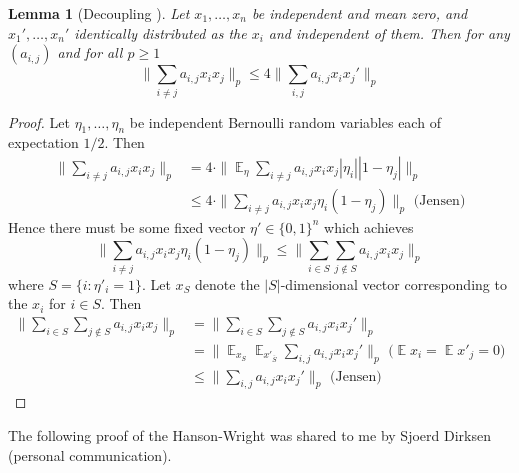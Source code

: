 \documentclass[12pt]{article}
\DeclareMathOperator*{\E}{\mathbb{E}}
\newtheorem{lemma}{Lemma}
\newcommand{\EquationName}[1]{\label{eq:#1}}
\newcommand{\LemmaName}[1]{\label{lem:#1}}
\begin{document}
\begin{lemma}[Decoupling {\cite{PenaG99}}]\LemmaName{decoupling}
Let $x_1,\ldots,x_n$ be independent and mean zero, and $x_1',\ldots,x_n'$ identically distributed as the $x_i$ and independent of them. Then for any $(a_{i,j})$ and for all $p\ge 1$
$$
\|\sum_{i\neq j} a_{i,j} x_i x_j\|_p \le 4 \|\sum_{i,j} a_{i ,j} x_i x_j'\|_p
$$
\end{lemma}
\begin{proof}
Let $\eta_1,\ldots,\eta_n$ be independent Bernoulli random variables each of expectation $1/2$. Then
\begin{align}
\nonumber \|\sum_{i\neq j} a_{i,j} x_i x_j\|_p &= 4\cdot \|\E_\eta \sum_{i\neq j} a_{i,j} x_i x_j |\eta_i| |1-\eta_j|\|_p\\
{}&\le 4\cdot \|\sum_{i\neq j} a_{i,j} x_i x_j \eta_i (1-\eta_j)\|_p \text{ (Jensen)}\EquationName{decouple-averaging}
\end{align}
Hence there must be some fixed vector $\eta'\in\{0,1\}^n$ which achieves
$$
\|\sum_{i\neq j} a_{i,j} x_i x_j \eta_i (1-\eta_j)\|_p\le \|\sum_{i\in S}\sum_{j\notin S} a_{i,j} x_i x_j\|_p
$$
where $S = \{ i : \eta'_i = 1\}$. Let $x_S$ denote the $|S|$-dimensional vector corresponding to the $x_i$ for $i\in S$.  Then
\begin{align*}
\|\sum_{i\in S}\sum_{j\notin S} a_{i,j} x_i x_j\|_p &= \|\sum_{i\in S}\sum_{j\notin S} a_{i,j} x_i x_j'\|_p\\
{}& = \|\E_{x_S}\E_{x'_{\bar{S}}}\sum_{i, j}a_{i,j} x_i x_j'\|_p\text{ (}\E x_i = \E x'_j = 0\text{)}\\
{}&\le \|\sum_{i, j}a_{i,j} x_i x_j'\|_p\text{ (Jensen)}
\end{align*}
\end{proof}

The following proof of the Hanson-Wright was shared to me by Sjoerd Dirksen (personal communication).
\end{document}
